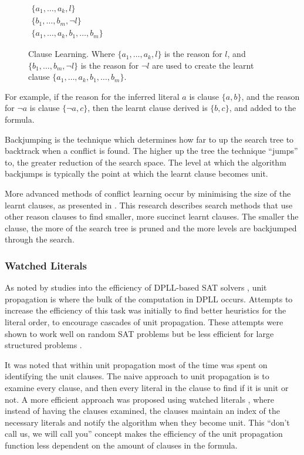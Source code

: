 \begin{figure}[htp]
\begin{center}
$\begin{array}{c}
\{a_1,\ldots,a_k, l\} \\
 \{b_1,\ldots,b_m,\neg l\}\\
\hline
\{a_1,\ldots,a_k, b_1,\ldots,b_m \}
\end{array}$
  \caption{Clause Learning. Where $\{a_1,\ldots,a_k, l\}$ is the reason for $l$, and $\{b_1,\ldots,b_m,\neg l\}$ is the reason for $\neg l$
   are used to create the learnt clause $\{a_1,\ldots,a_k, b_1,\ldots,b_m \}$.}
  \label{impl.clauselearning}
\end{center}
\end{figure}

For example, if the reason for the inferred literal $a$ is clause $\{a, b\}$, and the reason for $\neg a$ is clause $\{\neg a, c\}$,
then the learnt clause derived is $\{b,c\}$, and added to the formula.

Backjumping \citep{Gaschnig1979} is the technique which determines how far to up the search tree to backtrack when a conflict is found.
The higher up the tree the technique ``jumps'' to, the greater reduction of the search space.
The level at which the algorithm backjumps is typically the point at which the learnt clause becomes unit. 

More advanced methods of conflict learning occur by minimising the size of the learnt clauses, as presented in \citep{sorensson2009}.
This research describes search methods that use other reason clauses to find smaller, more succinct learnt clauses.
The smaller the clause, the more of the search tree is pruned and the more levels are backjumped through the search.

\subsubsection{Watched Literals}
As noted by studies into the efficiency of DPLL-based SAT solvers \citep{dixon2004automating}, unit propagation is where the bulk of the computation in DPLL occurs.
Attempts to increase the efficiency of this task was initially to find better heuristics \citep{JamesMCrawford1996} for the literal order, to encourage cascades of unit propagation.
These attempts were shown to work well on random SAT problems but be less efficient for large structured problems \citep{dixon2004automating}.

It was noted that within unit propagation most of the time was spent on identifying the unit clauses.
The naive approach to unit propagation is to examine every clause, and then every literal in the clause to find if it is unit or not.
A more efficient approach was proposed using watched literals \citep{Madigan2001}, where instead of having the clauses examined, 
the clauses maintain an index of the necessary literals and notify the algorithm when they become unit.
This ``don't call us, we will call you'' concept makes the efficiency of the unit propagation function less dependent on the amount of clauses in the formula.


